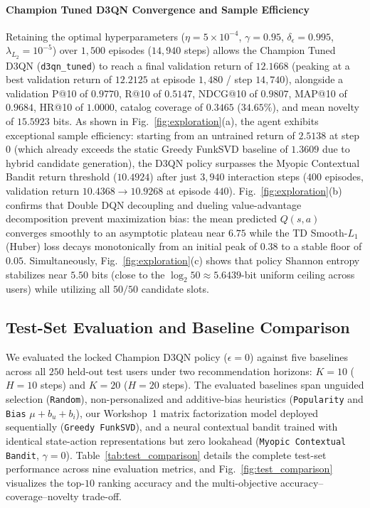 \paragraph{Champion Tuned D3QN Convergence and Sample Efficiency}
Retaining the optimal hyperparameters ($\eta = 5 \times 10^{-4}$, $\gamma = 0.95$, $\delta_\epsilon = 0.995$, $\lambda_{L_2} = 10^{-5}$) over $1{,}500$ episodes ($14{,}940$ steps) allows the Champion Tuned D3QN (\texttt{d3qn\_tuned}) to reach a final validation return of $12.1668$ (peaking at a best validation return of $12.2125$ at episode $1{,}480$ / step $14{,}740$), alongside a validation P@10 of $0.9770$, R@10 of $0.5147$, NDCG@10 of $0.9807$, MAP@10 of $0.9684$, HR@10 of $1.0000$, catalog coverage of $0.3465$ ($34.65\%$), and mean novelty of $15.5923$ bits. As shown in Fig.~\ref{fig:exploration}(a), the agent exhibits exceptional sample efficiency: starting from an untrained return of $2.5138$ at step $0$ (which already exceeds the static Greedy FunkSVD baseline of $1.3609$ due to hybrid candidate generation), the D3QN policy surpasses the Myopic Contextual Bandit return threshold ($10.4924$) after just $3{,}940$ interaction steps ($400$ episodes, validation return $10.4368 \to 10.9268$ at episode $440$). Fig.~\ref{fig:exploration}(b) confirms that Double DQN decoupling and dueling value-advantage decomposition prevent maximization bias: the mean predicted $Q(s,a)$ converges smoothly to an asymptotic plateau near $6.75$ while the TD Smooth-$L_1$ (Huber) loss decays monotonically from an initial peak of $0.38$ to a stable floor of $0.05$. Simultaneously, Fig.~\ref{fig:exploration}(c) shows that policy Shannon entropy stabilizes near $5.50$ bits (close to the $\log_2 50 \approx 5.6439$-bit uniform ceiling across users) while utilizing all $50/50$ candidate slots.

\subsection{Test-Set Evaluation and Baseline Comparison}
\label{subsec:test_eval}

We evaluated the locked Champion D3QN policy ($\epsilon = 0$) against five baselines across all $250$ held-out test users under two recommendation horizons: $K = 10$ ($H = 10$ steps) and $K = 20$ ($H = 20$ steps). The evaluated baselines span unguided selection (\texttt{Random}), non-personalized and additive-bias heuristics (\texttt{Popularity} and \texttt{Bias} $\mu + b_u + b_i$), our Workshop~1 matrix factorization model deployed sequentially (\texttt{Greedy FunkSVD}), and a neural contextual bandit trained with identical state-action representations but zero lookahead (\texttt{Myopic Contextual Bandit}, $\gamma = 0$). Table~\ref{tab:test_comparison} details the complete test-set performance across nine evaluation metrics, and Fig.~\ref{fig:test_comparison} visualizes the top-$10$ ranking accuracy and the multi-objective accuracy--coverage--novelty trade-off.

